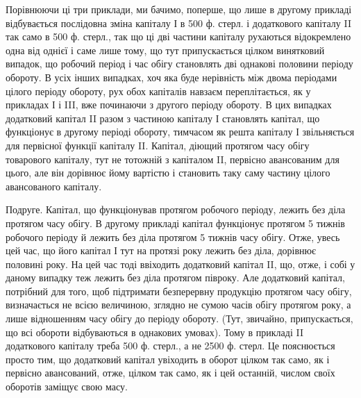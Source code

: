 Порівнюючи ці три приклади, ми бачимо, поперше, що лише в другому
прикладі відбувається послідовна зміна капіталу І в 500 ф. стерл.
і додаткового капіталу II так само в 500 ф. стерл., так що ці дві частини
капіталу рухаються відокремлено одна від однієї і саме лише тому, що
тут припускається цілком винятковий випадок, що робочий період і час
обігу становлять дві однакові половини періоду обороту. В усіх інших
випадках, хоч яка буде нерівність між двома періодами цілого періоду
обороту, рух обох капіталів навзаєм переплітається, як у прикладах
І і III, вже починаючи з другого періоду обороту. В цих випадках додатковий
капітал II разом з частиною капіталу І становлять капітал, що функціонує
в другому періоді обороту, тимчасом як решта капіталу І звільняється
для первісної функції капіталу II. Капітал, діющий протягом часу
обігу товарового капіталу, тут не тотожній з капіталом II, первісно авансованим
для цього, але він дорівнює йому вартістю і становить таку саму
частину цілого авансованого капіталу.

Подруге. Капітал, що функціонував протягом робочого періоду,
лежить без діла протягом часу обігу. В другому прикладі капітал функціонує
протягом 5 тижнів робочого періоду й лежить без діла протягом
5 тижнів часу обігу. Отже, увесь цей час, що його капітал І тут на протязі
року лежить без діла, дорівнює половині року. На цей час тоді ввіходить
додатковий капітал II, що, отже, і собі у даному випадку теж лежить без діла
протягом півроку. Але додатковий капітал, потрібний для того, щоб підтримати
безперервну продукцію протягом часу обігу, визначається не
всією величиною, зглядно не сумою часів обігу протягом року, а лише
відношенням часу обігу до періоду обороту. (Тут, звичайно, припускається,
що всі обороти відбуваються в однакових умовах). Тому в прикладі
II додаткового капіталу треба 500 ф. стерл., а не 2500 ф. стерл.
Це пояснюється просто тим, що додатковий капітал увіходить в оборот
цілком так само, як і первісно авансований, отже, цілком так само, як
і цей останній, числом своїх оборотів заміщує свою масу.


